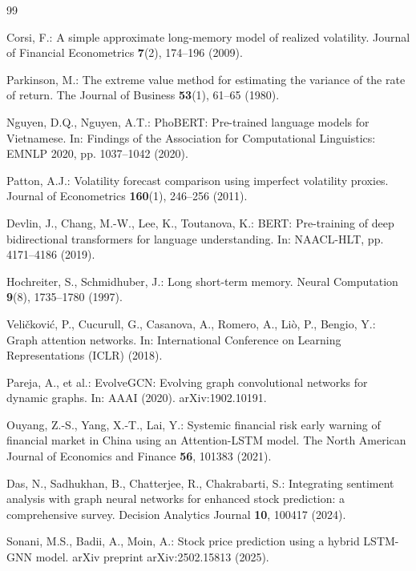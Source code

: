 \documentclass[runningheads]{llncs}
\begin{document}
%
%
\begin{thebibliography}{99}

Corsi, F.: A simple approximate long-memory model of realized volatility.
Journal of Financial Econometrics \textbf{7}(2), 174--196 (2009).

Parkinson, M.: The extreme value method for estimating the variance of the rate of return.
The Journal of Business \textbf{53}(1), 61--65 (1980).

Nguyen, D.Q., Nguyen, A.T.: PhoBERT: Pre-trained language models for Vietnamese.
In: Findings of the Association for Computational Linguistics: EMNLP 2020, pp. 1037--1042 (2020).

Patton, A.J.: Volatility forecast comparison using imperfect volatility proxies.
Journal of Econometrics \textbf{160}(1), 246--256 (2011).

Devlin, J., Chang, M.-W., Lee, K., Toutanova, K.: BERT: Pre-training of deep bidirectional
transformers for language understanding. In: NAACL-HLT, pp. 4171--4186 (2019).

Hochreiter, S., Schmidhuber, J.: Long short-term memory. Neural Computation \textbf{9}(8), 1735--1780 (1997).

Veli\v{c}kovi\'c, P., Cucurull, G., Casanova, A., Romero, A., Li\`o, P., Bengio, Y.:
Graph attention networks. In: International Conference on Learning Representations (ICLR) (2018).

Pareja, A., et al.: EvolveGCN: Evolving graph convolutional networks for dynamic graphs.
In: AAAI (2020). arXiv:1902.10191.

Ouyang, Z.-S., Yang, X.-T., Lai, Y.: Systemic financial risk early warning of financial market in China
using an Attention-LSTM model. The North American Journal of Economics and Finance \textbf{56}, 101383 (2021).

Das, N., Sadhukhan, B., Chatterjee, R., Chakrabarti, S.: Integrating sentiment analysis with graph neural
networks for enhanced stock prediction: a comprehensive survey. Decision Analytics Journal \textbf{10}, 100417 (2024).

Sonani, M.S., Badii, A., Moin, A.: Stock price prediction using a hybrid LSTM-GNN model.
arXiv preprint arXiv:2502.15813 (2025).


\end{thebibliography}
\end{document}
